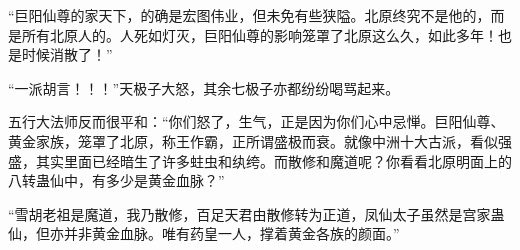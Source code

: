 \begin{this_body}
“巨阳仙尊的家天下，的确是宏图伟业，但未免有些狭隘。北原终究不是他的，而是所有北原人的。人死如灯灭，巨阳仙尊的影响笼罩了北原这么久，如此多年！也是时候消散了！”

“一派胡言！！！”天极子大怒，其余七极子亦都纷纷喝骂起来。

五行大法师反而很平和：“你们怒了，生气，正是因为你们心中忌惮。巨阳仙尊、黄金家族，笼罩了北原，称王作霸，正所谓盛极而衰。就像中洲十大古派，看似强盛，其实里面已经暗生了许多蛀虫和纨绔。而散修和魔道呢？你看看北原明面上的八转蛊仙中，有多少是黄金血脉？”

“雪胡老祖是魔道，我乃散修，百足天君由散修转为正道，凤仙太子虽然是宫家蛊仙，但亦并非黄金血脉。唯有药皇一人，撑着黄金各族的颜面。”

\end{this_body}

